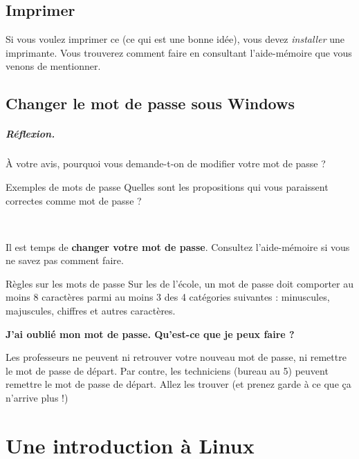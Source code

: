 \documentclass[a4paper,11pt]{style-esi/td}
\begin{document}
	\subsection{Imprimer}

		Si vous voulez imprimer ce  (ce qui est une bonne idée), 
		vous devez \textit{installer} une imprimante. 
		Vous trouverez comment faire en consultant l'aide-mémoire que vous venons de mentionner.
	
	\subsection{Changer le mot de passe sous Windows}

		\subparagraph{Réflexion.}
		À votre avis, pourquoi vous demande-t-on de modifier votre mot de passe ?
					
		\begin{Exercice}{Exemples de mots de passe} 		
			Quelles sont les propositions qui vous paraissent correctes comme mot de passe ?
			\par
			\qquad\checkbox~
			\qquad\checkbox~
			\qquad\checkbox~
			\qquad\checkbox~
		\end{Exercice} 
	
		Il est  temps de \textbf{changer votre mot de passe}. 
		Consultez l'aide-mémoire si vous ne savez pas comment faire. 
				
		\begin{infotbox}{Règles sur les mots de passe}
			Sur les  de l'école,
			un mot de passe doit comporter au moins 8 caractères
			parmi au moins 3 des 4 catégories suivantes : 
			minuscules, majuscules, chiffres et autres caractères.
		\end{infotbox}

		\begin{faq}
			\textbf{J'ai oublié mon mot de passe. Qu'est-ce que je peux faire ?}
			\par
			Les professeurs ne peuvent ni retrouver votre nouveau mot de passe, 
			ni remettre le mot de passe de départ. 
			Par contre, les techniciens (bureau au 5\ieme) 
			peuvent remettre le mot de passe de départ. 
			Allez les trouver (et prenez garde à ce que ça n'arrive plus !)
		\end{faq}
	
\newpage
\section{Une introduction à Linux}
\end{document}
